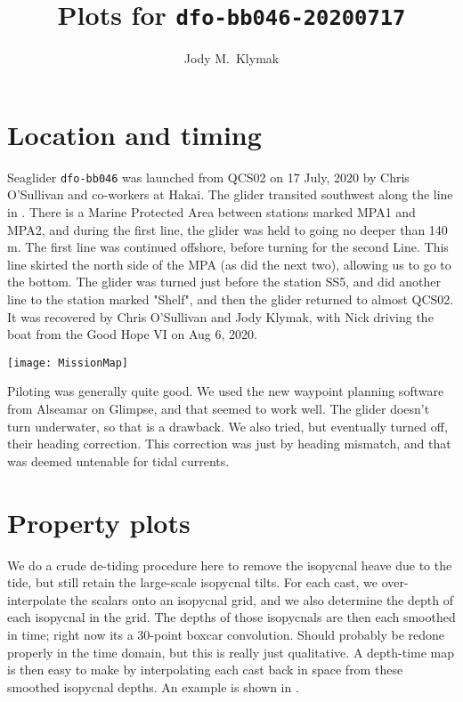 \documentclass[11pt]{article}
\title{Plots for \texttt{dfo-bb046-20200717}}
\author{Jody M.\ Klymak}
\newcommand{\twowidth}{6in}
\begin{document}
\maketitle 

\section{Location and timing}

Seaglider \texttt{dfo-bb046} was launched from QCS02 on 17 July, 2020 by Chris O'Sullivan and co-workers at Hakai.  The glider transited southwest along the line in .  There is a Marine Protected Area between stations marked MPA1 and MPA2, and during the first line, the glider was held to going no deeper than 140 m.  The first line was continued offshore, before turning for the second Line.  This line skirted the north side of the MPA (as did the next two), allowing us to go to the bottom.  The glider was turned just before the station SS5, and did another line to the station marked "Shelf", and then the glider returned to almost QCS02.  It was recovered by Chris O'Sullivan and Jody Klymak, with Nick driving the boat from the Good Hope VI on Aug 6, 2020.  

\begin{figure*}[htbp]
  \begin{center}
    \texttt{[image: MissionMap]}
    \caption{      
      \label{fig:MissionMap} }
  \end{center}
\end{figure*}

Piloting was generally quite good.  We used the new waypoint planning software from Alseamar on Glimpse, and that seemed to work well. The glider doesn't turn underwater, so that is a drawback.  We also tried, but eventually turned off, their heading correction.  This correction was just by heading mismatch, and that was deemed untenable for tidal currents. 

\section{Property plots}

We do a crude de-tiding procedure here to remove the isopycnal heave due to the tide, but still retain the large-scale isopycnal tilts.  For each cast, we over-interpolate the scalars onto an isopycnal grid, and we also determine the depth of each isopycnal in the grid.  The depths of those isopycnals are then each smoothed in time; right now its a 30-point boxcar convolution.  Should probably be redone properly in the time domain, but this is really just qualitative.  A depth-time map is then easy to make by interpolating each cast back in space from these smoothed isopycnal depths.  An example is shown in .  
\end{document}
